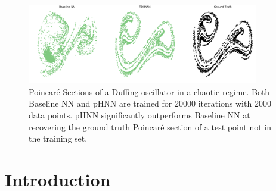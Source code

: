 \documentclass{article}
\begin{document}
\begin{abstract}
Learning the dynamics of complex physical systems requires models with well-chosen inductive biases. Recently, it was shown that neural networks designed to learn a Hamiltonian and exploit Hamilton's equations significantly outperform existing approaches in predicting trajectories of autonomous systems that depend implicitly on time. Despite this success, many real world physical systems are non-autonomous and depend explicitly on time. In this paper, we address this challenge by embedding a modified Port-Hamiltonian into our neural networks that extends the general Hamiltonian to capture damped and forced systems alike. We show that our network can learn the dynamics of complex physical systems such as a damped and driven oscillator, the Duffing equation in the chaotic regime, as well as a forced relativistic particle in a potential well. In all these settings, we show that our network can not only outperform existing baselines but can also accurately recover the underlying Hamiltonian, force and damping terms. We are also able to show that our network can be used to study the chaotic Duffing equation for long periodic trajectories and visually recover its Poincar\'e section - a crucial map in identifying chaotic trajectories. 
\end{abstract}

\begin{figure}[ht!]
\centering
\includegraphics[width=0.9\textwidth]{figures/main_fig.pdf}
\caption{Poincar\'e Sections of a Duffing oscillator in a chaotic regime. Both Baseline NN and pHNN are trained for 20000 iterations with 2000 data points. pHNN significantly outperforms Baseline NN at recovering the ground truth Poincar\'e section of a test point not in the training set.}
\label{fig.chaos1}
\end{figure}

\section{Introduction}
\end{document}
